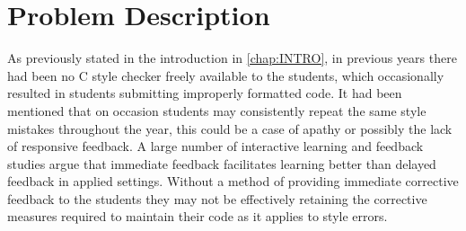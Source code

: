 \chapter{Problem Description}
\label{chap:PROBLEM}

As previously stated in the introduction in \autoref{chap:INTRO}, in previous 
years there had been no C style checker freely available to the students, which 
occasionally resulted in students submitting improperly formatted code.
It had been mentioned that on occasion students may consistently repeat the 
same style mistakes throughout the year, this could be a case of apathy or 
possibly the lack of responsive feedback. A large number of interactive 
learning and feedback studies argue that immediate feedback facilitates 
learning better than delayed feedback in applied settings.\citep{FEEDBACK}
Without a method of providing immediate corrective feedback to the students 
they may not be effectively retaining the corrective measures required to 
maintain their code as it applies to style errors.

